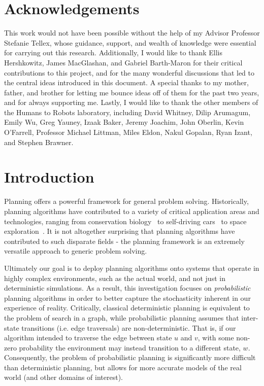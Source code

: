 \documentclass[11pt]{article}
\begin{document}
\newpage

\section*{Acknowledgements}
This work would not have been possible without the help of my Advisor Professor Stefanie Tellex, whose guidance, support, and wealth of knowledge were essential for carrying out this research. Additionally, I would like to thank Ellis Hershkowitz, James MacGlashan, and Gabriel Barth-Maron for their critical contributions to this project, and for the many wonderful discussions that led to the central ideas introduced in this document. A special thanks to my mother, father, and brother for letting me bounce ideas off of them for the past two years, and for always supporting me. Lastly, I would like to thank the other members of the Humans to Robots laboratory, including David Whitney, Dilip Arumagum, Emily Wu, Greg Yauney, Izaak Baker, Jeremy Joachim, John Oberlin, Kevin O'Farrell, Professor Michael Littman, Miles Eldon, Nakul Gopalan, Ryan Izant, and Stephen Brawner.

\newpage
\tableofcontents
\newpage

\section{Introduction}
\label{sec:introduction}

Planning offers a powerful framework for general problem solving. Historically, planning algorithms have contributed to a variety of critical application areas and technologies, ranging from conservation biology~\cite{possingham1997state} to self-driving cars~\cite{thrun2006stanley,montemerlo2008junior} to space exploration~\cite{bresina2005activity,backes1999automated,chien2000aspen}. It is not altogether surprising that planning algorithms have contributed to such disparate fields - the planning framework is an extremely versatile approach to generic problem solving.

Ultimately our goal is to deploy planning algorithms onto systems that operate in highly complex environments, such as the actual world, and not just in deterministic simulations. As a result, this investigation focuses on {\it probabilistic} planning algorithms in order to better capture the stochasticity inherent in our experience of reality. Critically, classical deterministic planning is equivalent to the problem of search in a graph, while probabilistic planning assumes that inter-state transitions (i.e. edge traversals) are non-deterministic. That is, if our algorithm intended to traverse the edge between state $u$ and $v$, with some non-zero probability the environment may instead transition to a different state, $w$. Consequently, the problem of probabilistic planning is significantly more difficult than deterministic planning, but allows for more accurate models of the real world (and other domains of interest).
\end{document}
